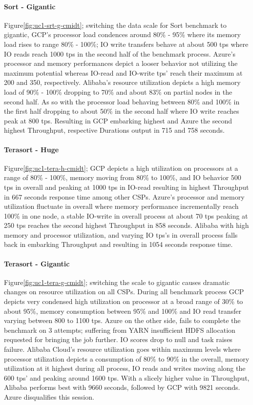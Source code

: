 \documentclass[review]{elsarticle}
\begin{document}
\paragraph{Sort - Gigantic} Figure\ref{fig:uc1-srt-g-cmidt}; switching the data scale for Sort benchmark to gigantic, GCP's processor load condences around 80\% - 95\% where its memory load rises to range 80\% - 100\%; IO write transfers behave at about 500 tps where IO reads reach 1000 tps in the second half of the benchmark process. Azure's processor and memory performances depict a looser behavior not utilizing the maximum potential whereas IO-read and IO-write tps' reach their maximum at 200 and 350, respectively. Alibaba's resource utilization depicts a high memory load of 90\% - 100\% dropping to 70\% and about 83\% on partial nodes in the second half. As so with the processor load behaving between 80\% and 100\% in the first half dropping to about 50\% in the second half where IO write reaches peak at 800 tps. Resulting in GCP embarking highest and Azure the second highest Throughput, respective Durations output in 715 and 758 seconds.

\paragraph{Terasort - Huge} Figure\ref{fig:uc1-tera-h-cmidt}; GCP depicts a high utilization on processors at a range of 80\% - 100\%, memory moving from 80\% to 100\%, and IO behavior 500 tps in overall and peaking at 1000 tps in IO-read resulting in highest Throughput in 667 seconds response time among other CSPs. Azure's processor and memory utilization fluctuate in overall where memory performance incrementally reach 100\% in one node, a stable IO-write in overall process at about 70 tps peaking at 250 tps reaches the second highest Throughput in 858 seconds. Alibaba with high memory and processor utilization, and varying IO tps's in overall process falls back in embarking Throughput and resulting in 1054 seconds response time.

\paragraph{Terasort - Gigantic} Figure\ref{fig:uc1-tera-g-cmidt}; switching the scale to gigantic causes dramatic changes on resource utilization on all CSPs. During all benchmark process GCP depicts very condensed high utilization on processor at a broad range of 30\% to about 95\%, memory consumption between 95\% and 100\% and IO read transfer varying between 800 to 1100 tps. Azure on the other side, fails to complete the benchmark on 3 attempts; suffering from YARN insufficient HDFS allocation requested for bringing the job further. IO scores drop to null and task raises failure. Alibaba Cloud's resource utilization goes within maximum levels where processor utilization depicts a consumption of 80\% to 90\% in the overall, memory utilization at it highest during all process, IO reads and writes moving along the 600 tps' and peaking around 1600 tps. With a slicely higher value in Throughput, Alibaba performs best with 9660 seconds, followed by GCP with 9821 seconds. Azure disqualifies this session.
\end{document}
